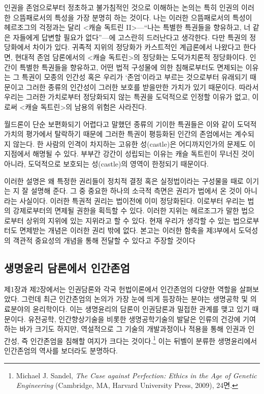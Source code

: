 인권을 존엄으로부터 정초하고 불가침적인 것으로 이해하는 논의는 특히 인권의 이러한 으뜸패로서의 특성을 가장 분명히 하는 것이다. 나는 이러한 으뜸패로서의 특성이 헤르조그의 걱정과는 달리 \textless 캐슬 독트린 II\textgreater---``나는 특별한 특권들을 향유하고, 너 같은 자들에게 답변할 필요가 없다''---에 고스란히 드러난다고 생각한다. 다만 특권의 정당화에서 차이가 있다. 귀족적 지위의 정당화가 카스트적인 계급론에서 나왔다고 한다면, 현대적 존엄 담론에서의 \textless 캐슬 독트린\textgreater 의 정당화는 도덕가치론적 정당화이다. 인간이 특별한 특권들을 향유하고, 어떤 법적 구성물에 의한 침해로부터도 면제되는 이유는 그 특권이 모종의 인간성 혹은 우리가 `존엄'이라고 부르는 것으로부터 유래되기 때문이고 그러한 종류의 인간성이 그러한 보호를 받을만한 가치가 있기 때문이다. 따라서 우리는 그러한 가치로부터 정당화되지 않는 특권을 도덕적으로 인정할 이유가 없고, 이로써 \textless 캐슬 독트린\textgreater 의 남용의 위험은 사라진다.

월드론이 단순 보편화되기 어렵다고 말했던 종류의 기이한 특권들은 이와 같이 도덕적 가치의 평가에서 탈락하기 때문에 그러한 특권이 평등화된 인간의 존엄에서는 계수되지 않는다. 한 사람의 인격이 차지하는 고유한 성(castle)은 어디까지인가의 문제도 이 지점에서 해명될 수 있다. 부부간 강간이 성립되는 이유는 캐슬 독트린이 무너진 것이 아니라, 도덕적으로 보호되는 성(castle)의 영역이 한정되기 때문이다.

이러한 설명은 왜 특정한 권리들이 정치적 결정 혹은 실정법이라는 구성물을 때로 이기는 지 잘 설명해 준다. 그 중 중요한 하나의 소극적 측면은 권리가 법에서 온 것이 아니라는 사실이다. 이러한 특권적 권리는 법이전에 이미 정당화된다. 이로부터 우리는 법의 강제로부터의 면제될 권한을 획득할 수 있다. 이러한 지위는 헤르조그가 말한 법으로부터 상위의 지위에 있는 지위라고 할 수 있다. 현재 우리가 생각할 수 있는 법으로부터도 면제받는 개념은 이러한 권리 밖에 없다. 본고는 이러한 함축을 제3부에서 도덕성의 객관적 중요성의 개념을 통해 전달할 수 있다고 주장할 것이다

\subsection{생명윤리 담론에서 인간존엄}

제1장과 제2장에서는 인권담론와 각국 헌법이론에서 인간존엄의 다양한 역할을 살펴보았다. 그런데 최근 인간존엄의 논의가 가장 눈에 띄게 등장하는 분야는 생명공학 및 의료분야의 윤리학이다. 이는 생명윤리의 담론이 인권담론과 밀접한 관계를 맺고 있기 때문이다. 유전공학, 인간향상기술을 비롯한 생명공학기술의 발달은 인류의 건강에 기여하는 바가 크기도 하지만, 역설적으로 그 기술의 개발과정이나 적용을 통해 인권과 인간성, 즉 인간존엄을 침해할 여지가 크다는 것이다.\footnote{Michael J. Sandel, \emph{The Case against Perfection: Ethics in the Age of Genetic Engineering} (Cambridge, MA, Harvard University Press, 2009), 24면.} 이는 뒤벨이 분류한 생명윤리에서 인간존엄의 역사를 보더라도 분명하다.

